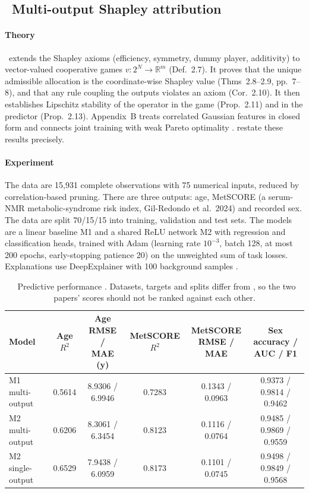 \documentclass[11pt,a4paper]{article}
\theoremstyle{plain}
\theoremstyle{definition}
\theoremstyle{remark}
\newcommand{\tagbox}[2]{\tcbox[on line,boxsep=1pt,left=2pt,right=2pt,top=0pt,bottom=0pt,
  colback=#1!12!white,colframe=#1,boxrule=0.4pt,arc=1pt]{\scriptsize\bfseries\color{#1}#2}}
\newcommand{\REP}{\tagbox{teal}{REPORTED}}
\newcommand{\R}{\mathbb{R}}
\begin{document}
\subsection{\PII\ Multi-output Shapley attribution}
\label{sec:P2}

\paragraph{Theory} \REP
\PII\ extends the Shapley axioms (efficiency, symmetry, dummy player, additivity) to vector-valued cooperative games $v:2^N\to\R^m$ (Def.~2.7). It proves that the unique admissible allocation is the coordinate-wise Shapley value (Thms~2.8--2.9, pp.~7--8), and that any rule coupling the outputs violates an axiom (Cor.~2.10). It then establishes Lipschitz stability of the operator in the game (Prop.~2.11) and in the predictor (Prop.~2.13). Appendix~B treats correlated Gaussian features in closed form and connects joint training with weak Pareto optimality \PII[pp.~22--25].  restate these results precisely.

\paragraph{Experiment} \REP
The data are 15,931 complete observations with 75 numerical inputs, reduced by correlation-based pruning. There are three outputs: age, MetSCORE (a serum-NMR metabolic-syndrome risk index, Gil-Redondo et al.\ 2024) and recorded sex. The data are split 70/15/15 into training, validation and test sets. The models are a linear baseline M1 and a shared ReLU network M2 with regression and classification heads, trained with Adam (learning rate $10^{-3}$, batch 128, at most 200 epochs, early-stopping patience 20) on the unweighted sum of task losses. Explanations use DeepExplainer with 100 background samples \PII[§§3.1--3.3, pp.~11--14].

\begin{table}[h]
\centering\footnotesize\setlength{\tabcolsep}{3.5pt}
\begin{tabular}{@{}lccccc@{}}
\toprule
Model & Age $R^2$ & \shortstack{Age RMSE /\\MAE (y)} & \shortstack{MetSCORE\\$R^2$} & \shortstack{MetSCORE\\RMSE / MAE} & \shortstack{Sex accuracy /\\AUC / F1}\\
\midrule
M1 multi-output & 0.5614 & 8.9306 / 6.9946 & 0.7283 & 0.1343 / 0.0963 & 0.9373 / 0.9814 / 0.9462\\
M2 multi-output & 0.6206 & 8.3061 / 6.3454 & 0.8123 & 0.1116 / 0.0764 & 0.9485 / 0.9869 / 0.9559\\
M2 single-output & 0.6529 & 7.9438 / 6.0959 & 0.8173 & 0.1101 / 0.0745 & 0.9498 / 0.9849 / 0.9568\\
\bottomrule
\end{tabular}
\caption{\REP\ Predictive performance \PII[Tables~1--2, pp.~13--14]. Datasets, targets and splits differ from \PI, so the two papers' scores should not be ranked against each other.}
\label{tab:P2perf}
\end{table}
\end{document}
